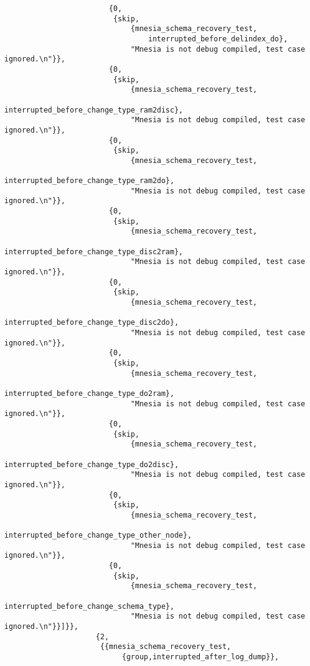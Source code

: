 \begin{verbatim}
                        {0,
                         {skip,
                             {mnesia_schema_recovery_test,
                                 interrupted_before_delindex_do},
                             "Mnesia is not debug compiled, test case ignored.\n"}},
                        {0,
                         {skip,
                             {mnesia_schema_recovery_test,
                                 interrupted_before_change_type_ram2disc},
                             "Mnesia is not debug compiled, test case ignored.\n"}},
                        {0,
                         {skip,
                             {mnesia_schema_recovery_test,
                                 interrupted_before_change_type_ram2do},
                             "Mnesia is not debug compiled, test case ignored.\n"}},
                        {0,
                         {skip,
                             {mnesia_schema_recovery_test,
                                 interrupted_before_change_type_disc2ram},
                             "Mnesia is not debug compiled, test case ignored.\n"}},
                        {0,
                         {skip,
                             {mnesia_schema_recovery_test,
                                 interrupted_before_change_type_disc2do},
                             "Mnesia is not debug compiled, test case ignored.\n"}},
                        {0,
                         {skip,
                             {mnesia_schema_recovery_test,
                                 interrupted_before_change_type_do2ram},
                             "Mnesia is not debug compiled, test case ignored.\n"}},
                        {0,
                         {skip,
                             {mnesia_schema_recovery_test,
                                 interrupted_before_change_type_do2disc},
                             "Mnesia is not debug compiled, test case ignored.\n"}},
                        {0,
                         {skip,
                             {mnesia_schema_recovery_test,
                                 interrupted_before_change_type_other_node},
                             "Mnesia is not debug compiled, test case ignored.\n"}},
                        {0,
                         {skip,
                             {mnesia_schema_recovery_test,
                                 interrupted_before_change_schema_type},
                             "Mnesia is not debug compiled, test case ignored.\n"}}]}},
                     {2,
                      {{mnesia_schema_recovery_test,
                           {group,interrupted_after_log_dump}},

\end{verbatim}
